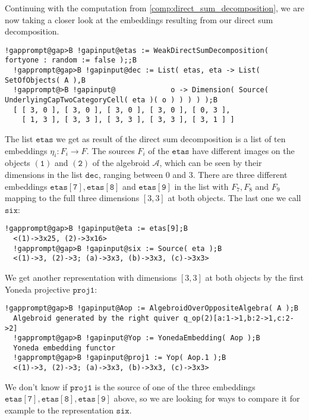 \begin{computation}
Continuing with the computation from \ref{comp:direct_sum_decomposition}, we are now taking a closer look at the embeddings
resulting from our direct sum decomposition.
\begin{Verbatim}[commandchars=!@B,fontsize=\small,frame=single,label=Example]
  !gapprompt@gap>B !gapinput@etas := WeakDirectSumDecomposition( fortyone : random := false );;B
  !gapprompt@gap>B !gapinput@dec := List( etas, eta -> List( SetOfObjects( A ),B
  !gapprompt@>B !gapinput@             o -> Dimension( Source( UnderlyingCapTwoCategoryCell( eta )( o ) ) ) ) );B
  [ [ 3, 0 ], [ 3, 0 ], [ 3, 0 ], [ 3, 0 ], [ 0, 3 ],
    [ 1, 3 ], [ 3, 3 ], [ 3, 3 ], [ 3, 3 ], [ 3, 1 ] ]
\end{Verbatim}
The list $\mathtt{etas}$ we get as result of the direct sum decomposition is a list of ten embeddings $\eta_{i} : F_{i} \rightarrow F$.
The sources $F_{i}$ of the $\mathtt{etas}$ have different images on the objects $\mathtt{(1)}$ and $\mathtt{(2)}$ of the algebroid $\mathcal{A}$,
which can be seen by their dimensions in the list $\mathtt{dec}$, ranging between $0$ and $3$.
There are three different embeddings $\mathtt{etas[7], etas[8]}$ and $\mathtt{etas[9]}$ in the list with $F_{7}, F_{8}$ and $F_{9}$
mapping to the full three dimensions $[ 3, 3 ]$ at both objects. The last one we call $\mathtt{six}$:
\begin{Verbatim}[commandchars=!@B,fontsize=\small,frame=single,label=Example]
  !gapprompt@gap>B !gapinput@eta := etas[9];B
  <(1)->3x25, (2)->3x16>
  !gapprompt@gap>B !gapinput@six := Source( eta );B
  <(1)->3, (2)->3; (a)->3x3, (b)->3x3, (c)->3x3>
\end{Verbatim}
We get another representation with dimensions $[ 3, 3 ]$ at both objects by the first Yoneda projective $\mathtt{proj1}$:
\begin{Verbatim}[commandchars=!@B,fontsize=\small,frame=single,label=Example]
  !gapprompt@gap>B !gapinput@Aop := AlgebroidOverOppositeAlgebra( A );B
  Algebroid generated by the right quiver q_op(2)[a:1->1,b:2->1,c:2->2]
  !gapprompt@gap>B !gapinput@Yop := YonedaEmbedding( Aop );B
  Yoneda embedding functor
  !gapprompt@gap>B !gapinput@proj1 := Yop( Aop.1 );B
  <(1)->3, (2)->3; (a)->3x3, (b)->3x3, (c)->3x3>
\end{Verbatim}
We don't know if $\mathtt{proj1}$ is the source of one of the three embeddings $\mathtt{etas[7], etas[8], etas[9]}$ above, so
we are looking for ways to compare it for example to the representation $\mathtt{six}$.


\end{computation}
